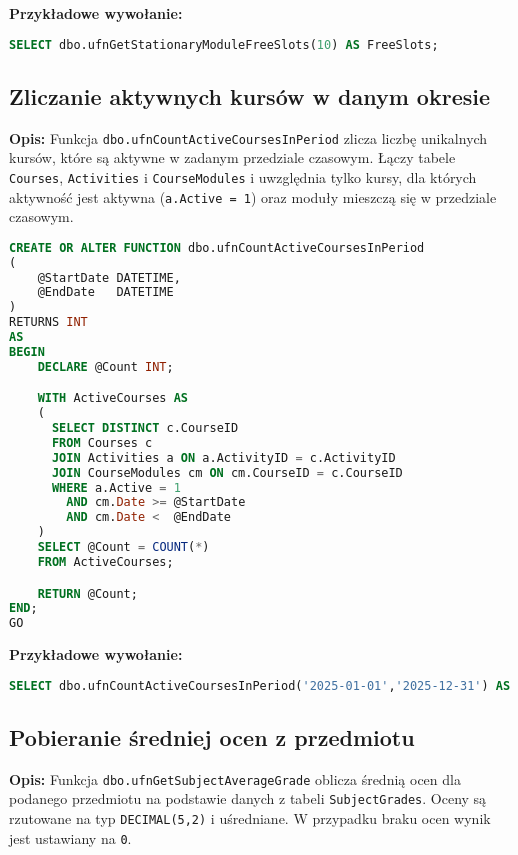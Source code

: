 \documentclass[12pt]{article}
\begin{document}
\textbf{Przykładowe wywołanie:}
\begin{lstlisting}[language=SQL]
SELECT dbo.ufnGetStationaryModuleFreeSlots(10) AS FreeSlots;
\end{lstlisting}

\newpage

\subsection{Zliczanie aktywnych kursów w danym okresie}
\label{sec:active_courses_period}

\textbf{Opis:} Funkcja \texttt{dbo.ufnCountActiveCoursesInPeriod} zlicza liczbę unikalnych kursów, które są aktywne w zadanym przedziale czasowym. Łączy tabele \texttt{Courses}, \texttt{Activities} i \texttt{CourseModules} i uwzględnia tylko kursy, dla których aktywność jest aktywna (\texttt{a.Active = 1}) oraz moduły mieszczą się w przedziale czasowym.

 
\begin{lstlisting}[language=SQL]
CREATE OR ALTER FUNCTION dbo.ufnCountActiveCoursesInPeriod
(
    @StartDate DATETIME,
    @EndDate   DATETIME
)
RETURNS INT
AS
BEGIN
    DECLARE @Count INT;

    WITH ActiveCourses AS
    (
      SELECT DISTINCT c.CourseID
      FROM Courses c
      JOIN Activities a ON a.ActivityID = c.ActivityID
      JOIN CourseModules cm ON cm.CourseID = c.CourseID
      WHERE a.Active = 1
        AND cm.Date >= @StartDate
        AND cm.Date <  @EndDate
    )
    SELECT @Count = COUNT(*)
    FROM ActiveCourses;

    RETURN @Count;
END;
GO
\end{lstlisting}

\textbf{Przykładowe wywołanie:}
\begin{lstlisting}[language=SQL]
SELECT dbo.ufnCountActiveCoursesInPeriod('2025-01-01','2025-12-31') AS TotalActiveCourses;
\end{lstlisting}


\newpage
\subsection{Pobieranie średniej ocen z przedmiotu}
\label{sec:subject_average_grade}

\textbf{Opis:} Funkcja \texttt{dbo.ufnGetSubjectAverageGrade} oblicza średnią ocen dla podanego przedmiotu na podstawie danych z tabeli \texttt{SubjectGrades}. Oceny są rzutowane na typ \texttt{DECIMAL(5,2)} i uśredniane. W przypadku braku ocen wynik jest ustawiany na \texttt{0}.
\end{document}
